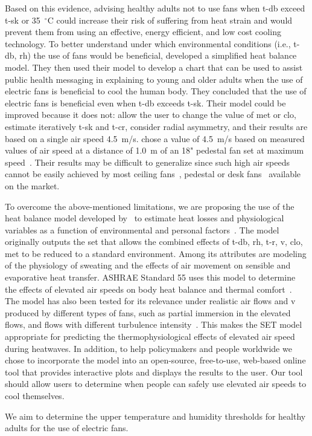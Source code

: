 Based on this evidence, advising healthy adults not to use fans when \ac{t-db} exceed \ac{t-sk} or 35~$^{\circ}$C could increase their risk of suffering from heat strain and would prevent them from using an effective, energy efficient, and low cost cooling technology.
To better understand under which environmental conditions (i.e., \ac{t-db}, \ac{rh}) the use of fans would be beneficial,  developed a simplified heat balance model.
They then used their model to develop a chart that can be used to assist public health messaging in explaining to young and older adults when the use of electric fans is beneficial to cool the human body.
They concluded that the use of electric fans is beneficial even when \ac{t-db} exceeds \ac{t-sk}.
Their model could be improved because it does not: allow the user to change the value of \ac{met} or \ac{clo}, estimate iteratively \ac{t-sk} and \ac{t-cr}, consider radial asymmetry, and their results are based on a single air speed 4.5~m/s.
 chose a value of 4.5~m/s based on measured values of air speed at a distance of 1.0~m of an 18" pedestal fan set at maximum speed~\cite{Jay2015}.
Their results may be difficult to generalize since such high air speeds cannot be easily achieved by most ceiling fans~\cite{Raftery2019}, pedestal or desk fans~\cite{Yang2015a} available on the market.

To overcome the above-mentioned limitations, we are proposing the use of the heat balance model developed by~ to estimate heat losses and physiological variables as a function of environmental and personal factors~\cite{Gagge1986}.
The model originally outputs the \ac{set} that allows the combined effects of \ac{t-db}, \ac{rh}, \ac{t-r}, \ac{v}, \ac{clo}, \ac{met} to be reduced to a standard environment.
Among its attributes are modeling of the physiology of sweating and the effects of air movement on sensible and evaporative heat transfer.
ASHRAE Standard 55 uses this model to determine the effects of elevated air speeds on body heat balance and thermal comfort~\cite{ashrae552017}.
The model has also been tested for its relevance under realistic air flows and \ac{v} produced by different types of fans, such as partial immersion in the elevated flows, and flows with different turbulence intensity~\cite{Huang2014}.
This makes the SET model appropriate for predicting the thermophysiological effects of elevated air speed during heatwaves.
In addition, to help policymakers and people worldwide we chose to incorporate the model into an open-source, free-to-use, web-based online tool that provides interactive plots and displays the results to the user.
Our tool should allow users to determine when people can safely use elevated air speeds to cool themselves.

We aim to determine the upper temperature and humidity thresholds for healthy adults for the use of electric fans.
